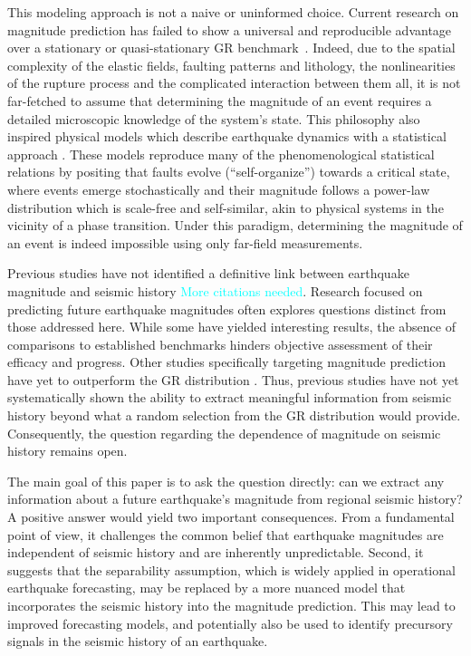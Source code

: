 \documentclass[pdflatex]{sn-jnl}
\newcommand{\neri}[1]{{\textcolor{cyan}{#1}}}
\begin{document}
This modeling approach is not a naive or uninformed choice.  Current research on magnitude prediction has failed to show a universal and reproducible advantage over a stationary or quasi-stationary GR benchmark~\cite{ogata_exploring_2018, stockman_forecasting_2023}. Indeed, due to the spatial complexity of the elastic fields, faulting patterns and lithology, the nonlinearities of the rupture process and the complicated interaction between them all, it is not far-fetched to assume that determining the magnitude of an event requires a detailed microscopic knowledge of the system's state. 
This philosophy also inspired physical models which describe earthquake dynamics with a statistical approach \cite{olami_self-organized_1992, sornette_self-organized_1989, bak_earthquakes_1989, de_geus_scaling_2022}. These models reproduce many of the phenomenological statistical relations by positing that faults evolve (``self-organize'') towards a critical state, where events emerge stochastically and their magnitude follows a power-law distribution which is scale-free and self-similar, akin to physical systems in the vicinity of a phase transition. Under this paradigm, determining the magnitude of an event is indeed impossible using only far-field measurements. 

Previous studies have not identified a definitive link between earthquake magnitude and seismic history \cite{petrillo_verifying_2023}\neri{More citations needed}. Research focused on predicting future earthquake magnitudes often explores questions distinct from those addressed here. While some have yielded interesting results, the absence of comparisons to established benchmarks \cite{shcherbakov_forecasting_2019, panakkat_neural_2007} hinders objective assessment of their efficacy and progress. Other studies specifically targeting magnitude prediction have yet to outperform the GR distribution \cite{stockman_forecasting_2023}. Thus, previous studies have not yet systematically shown the ability to extract meaningful information from seismic history beyond what a random selection from the GR distribution would provide. Consequently, the question regarding the dependence of magnitude on seismic history remains open.

The main goal of this paper is to ask the question directly: can we extract any information about a future earthquake's magnitude from regional seismic history? A positive answer would yield two important consequences. From a fundamental point of view, it challenges the common belief that earthquake magnitudes are independent of seismic history and are inherently unpredictable. Second, it suggests that the separability assumption, which is widely applied in operational earthquake forecasting, may be replaced by a more nuanced model that incorporates the seismic history into the magnitude prediction. This may lead to improved forecasting models, and potentially also be used to identify precursory signals in the seismic history of an earthquake.
\end{document}
